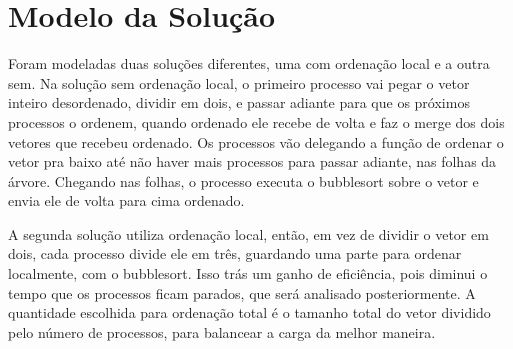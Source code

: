 \section{Modelo da Solução}

Foram modeladas duas soluções diferentes, uma com ordenação local e a outra sem. Na solução sem ordenação local, o primeiro processo vai pegar o vetor inteiro desordenado, dividir em dois, e passar adiante para que os próximos processos o ordenem, quando ordenado ele recebe de volta e faz o merge dos dois vetores que recebeu ordenado. Os processos vão delegando a função de ordenar o vetor pra baixo até não haver mais processos para passar adiante, nas folhas da árvore. Chegando nas folhas, o processo executa o bubblesort sobre o vetor e envia ele de volta para cima ordenado.

A segunda solução utiliza ordenação local, então, em vez de dividir o vetor em dois, cada processo divide ele em três, guardando uma parte para ordenar localmente, com o bubblesort. Isso trás um ganho de eficiência, pois diminui o tempo que os processos ficam parados, que será analisado posteriormente. A quantidade escolhida para ordenação total é o tamanho total do vetor dividido pelo número de processos, para balancear a carga da melhor maneira.